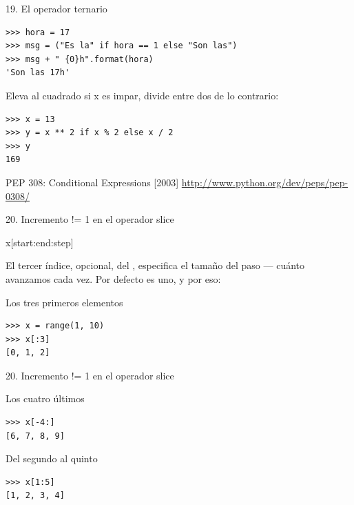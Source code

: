 \documentclass[14pt]{beamer}
\begin{document}
\begin{frame}[fragile]{19. El operador ternario}
  \footnotesize
  \begin{exampleblock}{}
    \begin{lstlisting}
>>> hora = 17
>>> msg = ("Es la" if hora == 1 else "Son las")
>>> msg + " {0}h".format(hora)
'Son las 17h'
    \end{lstlisting}
  \end{exampleblock}

  \begin{exampleblock}
    {Eleva al cuadrado si x es impar, divide entre dos de lo contrario:}
    \begin{lstlisting}
>>> x = 13
>>> y = x ** 2 if x % 2 else x / 2
>>> y
169
    \end{lstlisting}
  \end{exampleblock}

  \small
  \begin{block}
    {\centering PEP 308: Conditional Expressions [2003]}
    \centering \url{http://www.python.org/dev/peps/pep-0308/}
  \end{block}
\end{frame}

\begin{frame}[fragile]
  {20. \large Incremento != 1 en el operador slice}
  \begin{block}{}
    \centering \LARGE x[start:end:step]
  \end{block}

  \small
  \begin{center}
    El tercer índice, opcional, del ,
    especifica el tamaño del paso --- cuánto avanzamos cada vez.
    Por defecto es uno, y por eso:
  \end{center}

  \begin{exampleblock}
    {Los tres primeros elementos}
    \begin{lstlisting}
>>> x = range(1, 10)
>>> x[:3]
[0, 1, 2]
    \end{lstlisting}
  \end{exampleblock}
\end{frame}

\begin{frame}[fragile]
  {20. \large Incremento != 1 en el operador slice}
  \begin{exampleblock}
    {Los cuatro últimos}
    \begin{lstlisting}
>>> x[-4:]
[6, 7, 8, 9]
    \end{lstlisting}
  \end{exampleblock}

  \begin{exampleblock}
    {Del segundo al quinto}
    \begin{lstlisting}
>>> x[1:5]
[1, 2, 3, 4]
    \end{lstlisting}
  \end{exampleblock}
\end{frame}
\end{document}
